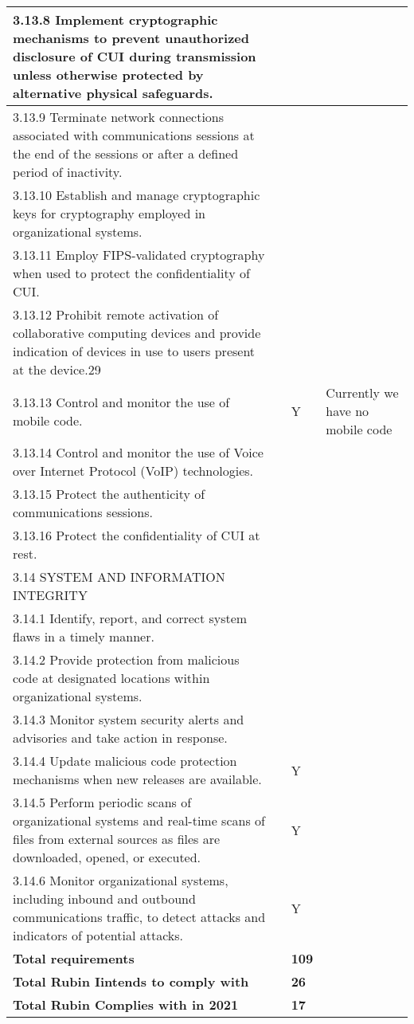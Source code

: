 \begin{longtable} {|p{}|p{}|p{}|p{} |}
{3.13.8 Implement cryptographic mechanisms to prevent unauthorized disclosure of CUI during transmission unless otherwise protected by alternative physical safeguards.}&&& \\ \hline
{3.13.9 Terminate network connections associated with communications sessions at the end of the sessions or after a defined period of inactivity.}&&& \\ \hline
{3.13.10 Establish and manage cryptographic keys for cryptography employed in organizational systems.}&&& \\ \hline
{3.13.11 Employ FIPS-validated cryptography when used to protect the confidentiality of CUI.}&&& \\ \hline
{3.13.12 Prohibit remote activation of collaborative computing devices and provide indication of devices in use to users present at the device.29}&&& \\ \hline
{3.13.13 Control and monitor the use of mobile code.}&{}&{Y}&{Currently we have no mobile code} \\ \hline
{3.13.14 Control and monitor the use of Voice over Internet Protocol (VoIP) technologies.}&&& \\ \hline
{3.13.15 Protect the authenticity of communications sessions.}&&& \\ \hline
{3.13.16 Protect the confidentiality of CUI at rest.}&&& \\ \hline
{3.14 SYSTEM AND INFORMATION INTEGRITY}&&& \\ \hline
{3.14.1 Identify, report, and correct system flaws in a timely manner.}&&& \\ \hline
{3.14.2 Provide protection from malicious code at designated locations within organizational systems.}&&& \\ \hline
{3.14.3 Monitor system security alerts and advisories and take action in response.}&&& \\ \hline
{3.14.4 Update malicious code protection mechanisms when new releases are available.}&{}&{Y}& \\ \hline
{3.14.5 Perform periodic scans of organizational systems and real-time scans of files from external sources as files are downloaded, opened, or executed.}&{}&{Y}& \\ \hline
{3.14.6 Monitor organizational systems, including inbound and outbound communications traffic, to detect attacks and indicators of potential attacks.}&{}&{Y}& \\ \hline
\textbf{Total requirements}&\textbf{}&\textbf{109}& \\ \hline
\textbf{Total Rubin Iintends to comply with }&\textbf{}&\textbf{26}& \\ \hline
\textbf{Total Rubin Complies with in 2021}&\textbf{}&\textbf{17}& \\ \hline
\end{longtable} \normalsize
